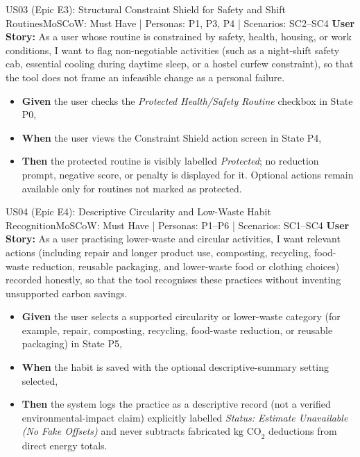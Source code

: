 \documentclass[12pt,a4paper]{article}
\begin{document}
\begin{storybox}{US03 (Epic E3): Structural Constraint Shield for Safety and Shift Routines}{MoSCoW: Must Have | Personas: P1, P3, P4 | Scenarios: SC2--SC4}
\textbf{User Story:} As a user whose routine is constrained by safety, health, housing, or work conditions, I want to flag non-negotiable activities (such as a night-shift safety cab, essential cooling during daytime sleep, or a hostel curfew constraint), so that the tool does not frame an infeasible change as a personal failure.
\begin{itemize}
    \item \textbf{Given} the user checks the \textit{Protected Health/Safety Routine} checkbox in State P0,
    \item \textbf{When} the user views the Constraint Shield action screen in State P4,
    \item \textbf{Then} the protected routine is visibly labelled \textit{Protected}; no reduction prompt, negative score, or penalty is displayed for it. Optional actions remain available only for routines not marked as protected.
\end{itemize}
\end{storybox}

\begin{storybox}{US04 (Epic E4): Descriptive Circularity and Low-Waste Habit Recognition}{MoSCoW: Must Have | Personas: P1--P6 | Scenarios: SC1--SC4}
\textbf{User Story:} As a user practising lower-waste and circular activities, I want relevant actions (including repair and longer product use, composting, recycling, food-waste reduction, reusable packaging, and lower-waste food or clothing choices) recorded honestly, so that the tool recognises these practices without inventing unsupported carbon savings.
\begin{itemize}
    \item \textbf{Given} the user selects a supported circularity or lower-waste category (for example, repair, composting, recycling, food-waste reduction, or reusable packaging) in State P5,
    \item \textbf{When} the habit is saved with the optional descriptive-summary setting selected,
    \item \textbf{Then} the system logs the practice as a descriptive record (not a verified environmental-impact claim) explicitly labelled \textit{Status: Estimate Unavailable (No Fake Offsets)} and never subtracts fabricated $\text{kg CO}_2$ deductions from direct energy totals.
\end{itemize}
\end{storybox}
\end{document}

